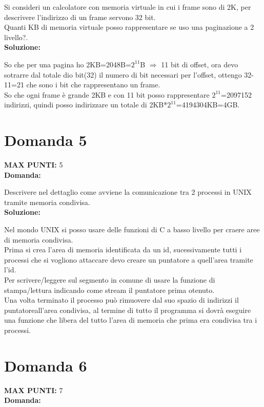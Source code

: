 \documentclass{article}
\begin{document}
    Si consideri un calcolatore con memoria virtuale in cui i frame sono di 2K, per descrivere l'indirizzo di un frame servono 32 bit.\\
    Quanti KB di memoria virtuale posso rappresentare se uso una paginazione a 2 livello?.\\
    \textbf{Soluzione:}


    So che per una pagina ho 2KB=2048B=$2^{11}$B $\Rightarrow$ 11 bit di offset, ora devo sotrarre dal totale dio bit(32) il numero di bit necessari per l'offset, ottengo 32-11=21 che sono i bit che rappresentano un frame.\\
    So che ogni frame è grande 2KB e con 11 bit posso rappresentare $2^{11}$=2097152 indirizzi, quindi posso indirizzare un totale di 2KB*$2^{11}$=4194304KB=4GB.
    \section*{Domanda 5}
    \textbf{MAX PUNTI:} 5\\
    \textbf{Domanda:}


    Descrivere nel dettaglio come avviene la comunicazione tra 2 processi in UNIX tramite memoria condivisa.\\
    \textbf{Soluzione:}


    Nel mondo UNIX si posso usare delle funzioni di C a basso livello per craere aree di memoria condivisa.\\
    Prima si crea l'area di memoria identificata da un id, sucessivamente tutti i processi che si vogliono attaccare devo creare un puntatore a quell'area tramite l'id.\\
    Per scrivere/leggere sul segmento in comune di usare la funzione di stampa/lettura indicando come stream il puntatore prima otenuto.\\
    Una volta terminato il processo può rimuovere dal suo spazio di indirizzi il puntatoreall'area condivisa, al termine di tutto il programma si dovrà eseguire una funzione che libera del tutto l'area di memoria che prima era condivisa tra i processi.
    \section*{Domanda 6}
    \textbf{MAX PUNTI:} 7\\
    \textbf{Domanda:}
    
\end{document}
